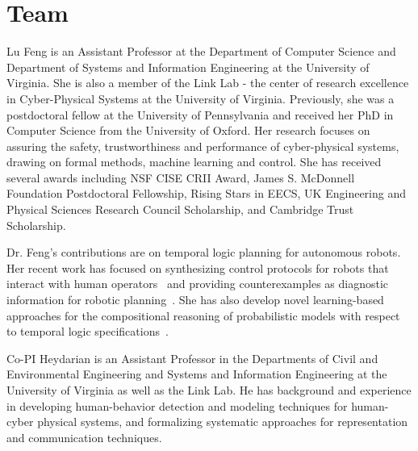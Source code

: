 \section{Team}
\label{sec:team}

Lu Feng is an Assistant Professor at the Department of Computer Science and Department of Systems and Information Engineering at the University of Virginia. She is also a member of the Link Lab - the center of research excellence in Cyber-Physical Systems at the University of Virginia. Previously, she was a postdoctoral fellow at the University of Pennsylvania and received her PhD in Computer Science from the University of Oxford. Her research focuses on assuring the safety, trustworthiness and performance of cyber-physical systems, drawing on formal methods, machine learning and control. She has received several awards including NSF CISE CRII Award, James S. McDonnell Foundation Postdoctoral Fellowship, Rising Stars in EECS, UK Engineering and Physical Sciences Research Council Scholarship, and Cambridge Trust Scholarship.

Dr. Feng's contributions are on temporal logic planning for autonomous robots. Her recent work has focused on synthesizing control protocols for robots that interact with human operators~\cite{feng2016synthesis,feng2015controller} and providing counterexamples as diagnostic information for robotic planning~\cite{feng2018cex,feng2016human}.
She has also develop novel learning-based approaches for the compositional reasoning of probabilistic models with respect to temporal logic specifications~\cite{feng2013learning,feng2011learning,feng2011automated,feng2010compositional}.

Co-PI Heydarian is an Assistant Professor in the Departments of Civil and Environmental Engineering and Systems and Information Engineering at the University of Virginia as well as the Link Lab. He has background and experience in developing human-behavior detection and modeling techniques for human-cyber physical systems, and formalizing systematic approaches for representation and communication techniques.  

